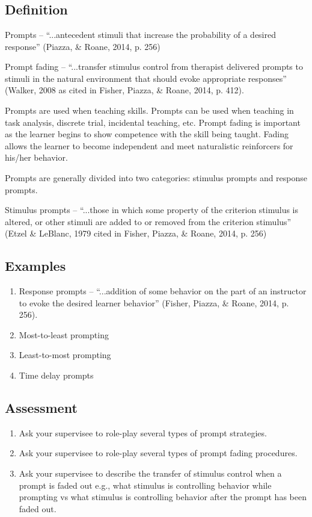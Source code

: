 \clearpage \section{\fourdThree{}}
\subsection{Definition}
Prompts – ``...antecedent stimuli that increase the probability of a desired response'' (Piazza, \& Roane, 2014, p. 256)

Prompt fading – ``...transfer stimulus control from therapist delivered prompts to stimuli in the natural environment that should evoke appropriate responses'' (Walker, 2008 as cited in Fisher, Piazza, \& Roane, 2014, p. 412).

Prompts are used when teaching skills. Prompts can be used when teaching in task analysis, discrete trial, incidental teaching, etc. Prompt fading is important as the learner begins to show competence with the skill being taught. Fading allows the learner to become independent and meet naturalistic reinforcers for his/her behavior.

Prompts are generally divided into two categories: stimulus prompts and response prompts.

Stimulus prompts – ``...those in which some property of the criterion stimulus is altered, or other stimuli are added to or removed from the criterion stimulus'' (Etzel \& LeBlanc, 1979 cited in Fisher, Piazza, \& Roane, 2014, p. 256)
\subsection{Examples}
\begin{enumerate}
\item Response prompts – ``...addition of some behavior on the part of an instructor to evoke the desired learner behavior'' (Fisher, Piazza, \& Roane, 2014, p. 256).
\item Most-to-least prompting
\item Least-to-most prompting
\item Time delay prompts
\end{enumerate}
%
\subsection{Assessment}
\begin{enumerate}
\item Ask your supervisee to role-play several types of prompt strategies.
\item Ask your supervisee to role-play several types of prompt fading procedures.
\item Ask your supervisee to describe the transfer of stimulus control when a prompt is faded out e.g., what stimulus is controlling behavior while prompting vs what stimulus is controlling behavior after the prompt has been faded out.
\end{enumerate}
%
